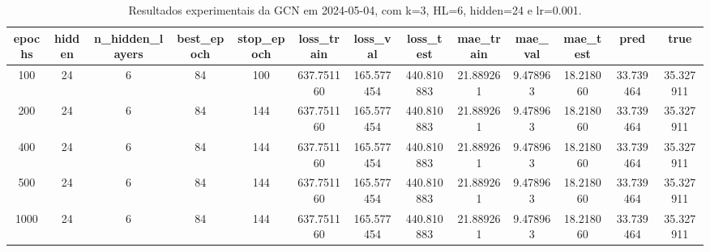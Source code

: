 \begin{table}[h]
\centering
\caption{Resultados experimentais da GCN em 2024-05-04, com k=3, HL=6, hidden=24 e lr=0.001.}
\label{tab:gcn_results_k3_hl6_h24_d20240504}
\begin{tabular}{ccccccccccccc}
\toprule
epochs & hidden & n\_hidden\_layers & best\_epoch & stop\_epoch & loss\_train & loss\_val & loss\_test & mae\_train & mae\_val & mae\_test & pred & true \\
\midrule
100 & 24 & 6 & 84 & 100 & 637.751160 & 165.577454 & 440.810883 & 21.889261 & 9.478963 & 18.218060 & 33.739464 & 35.327911 \\
200 & 24 & 6 & 84 & 144 & 637.751160 & 165.577454 & 440.810883 & 21.889261 & 9.478963 & 18.218060 & 33.739464 & 35.327911 \\
400 & 24 & 6 & 84 & 144 & 637.751160 & 165.577454 & 440.810883 & 21.889261 & 9.478963 & 18.218060 & 33.739464 & 35.327911 \\
500 & 24 & 6 & 84 & 144 & 637.751160 & 165.577454 & 440.810883 & 21.889261 & 9.478963 & 18.218060 & 33.739464 & 35.327911 \\
1000 & 24 & 6 & 84 & 144 & 637.751160 & 165.577454 & 440.810883 & 21.889261 & 9.478963 & 18.218060 & 33.739464 & 35.327911 \\
\bottomrule
\end{tabular}
\end{table}
